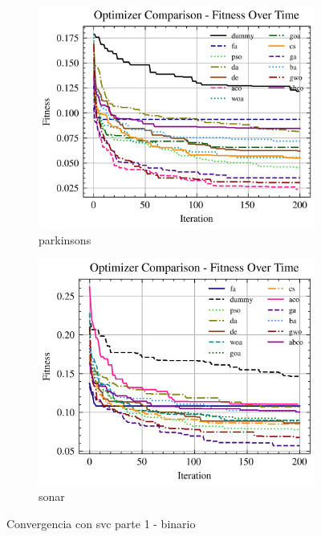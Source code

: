 \begin{figure}[htp]
    \begin{subfigure}[htp]{0.45\textwidth}
        \includegraphics[width=\textwidth]{imagenes/fitness_charts/img/binary/parkinsons/optimizers_fitness_svc.png}
        \caption{parkinsons}
        \label{fig:convergencia_parkinsons_svc}
    \end{subfigure}
    \begin{subfigure}[htp]{0.45\textwidth}
        \includegraphics[width=\textwidth]{imagenes/fitness_charts/img/binary/sonar/optimizers_fitness_svc.png}
        \caption{sonar}
        \label{fig:convergencia_sonar_svc}
    \end{subfigure}
    \caption{Convergencia con svc parte 1 - binario}
    \label{fig:convergencia_svc_1}
\end{figure}

